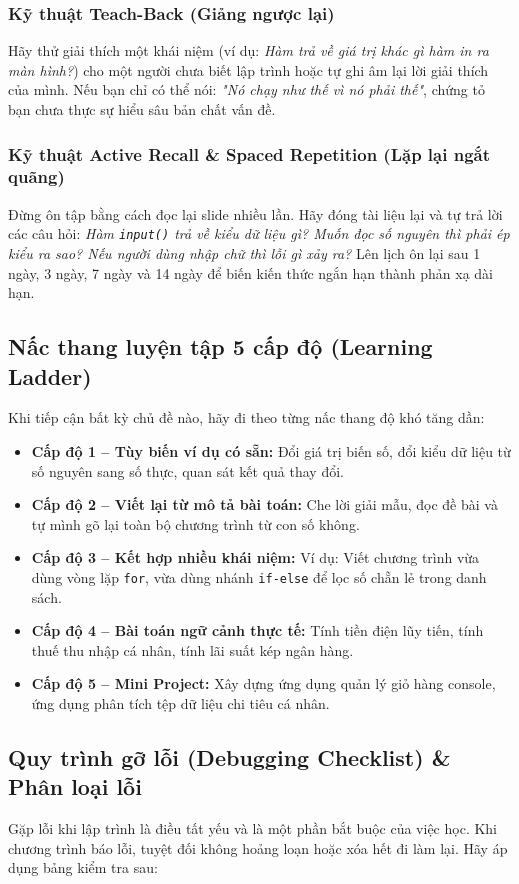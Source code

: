 \documentclass[11pt,a4paper]{article}
\begin{document}
\subsubsection{Kỹ thuật Teach-Back (Giảng ngược lại)}
Hãy thử giải thích một khái niệm (ví dụ: \textit{Hàm trả về giá trị khác gì hàm in ra màn hình?}) cho một người chưa biết lập trình hoặc tự ghi âm lại lời giải thích của mình. Nếu bạn chỉ có thể nói: \textit{"Nó chạy như thế vì nó phải thế"}, chứng tỏ bạn chưa thực sự hiểu sâu bản chất vấn đề.

\subsubsection{Kỹ thuật Active Recall \& Spaced Repetition (Lặp lại ngắt quãng)}
Đừng ôn tập bằng cách đọc lại slide nhiều lần. Hãy đóng tài liệu lại và tự trả lời các câu hỏi: \textit{Hàm \texttt{input()} trả về kiểu dữ liệu gì? Muốn đọc số nguyên thì phải ép kiểu ra sao? Nếu người dùng nhập chữ thì lỗi gì xảy ra?} Lên lịch ôn lại sau 1 ngày, 3 ngày, 7 ngày và 14 ngày để biến kiến thức ngắn hạn thành phản xạ dài hạn.

\subsection{Nấc thang luyện tập 5 cấp độ (Learning Ladder)}
Khi tiếp cận bất kỳ chủ đề nào, hãy đi theo từng nấc thang độ khó tăng dần:
\begin{itemize}[leftmargin=1.5em, itemsep=3pt]
    \item \textbf{Cấp độ 1 -- Tùy biến ví dụ có sẵn:} Đổi giá trị biến số, đổi kiểu dữ liệu từ số nguyên sang số thực, quan sát kết quả thay đổi.
    \item \textbf{Cấp độ 2 -- Viết lại từ mô tả bài toán:} Che lời giải mẫu, đọc đề bài và tự mình gõ lại toàn bộ chương trình từ con số không.
    \item \textbf{Cấp độ 3 -- Kết hợp nhiều khái niệm:} Ví dụ: Viết chương trình vừa dùng vòng lặp \texttt{for}, vừa dùng nhánh \texttt{if-else} để lọc số chẵn lẻ trong danh sách.
    \item \textbf{Cấp độ 4 -- Bài toán ngữ cảnh thực tế:} Tính tiền điện lũy tiến, tính thuế thu nhập cá nhân, tính lãi suất kép ngân hàng.
    \item \textbf{Cấp độ 5 -- Mini Project:} Xây dựng ứng dụng quản lý giỏ hàng console, ứng dụng phân tích tệp dữ liệu chi tiêu cá nhân.
\end{itemize}

\subsection{Quy trình gỡ lỗi (Debugging Checklist) \& Phân loại lỗi}
Gặp lỗi khi lập trình là điều tất yếu và là một phần bắt buộc của việc học. Khi chương trình báo lỗi, tuyệt đối không hoảng loạn hoặc xóa hết đi làm lại. Hãy áp dụng bảng kiểm tra sau:
\end{document}
